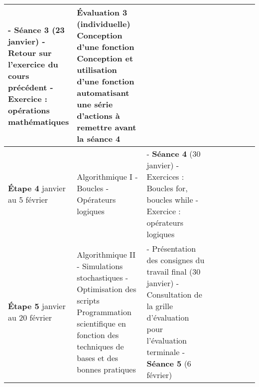 \documentclass[12]{article}
\begin{document}
\begin{center}
\begin{tabular}{| p{0.1\linewidth} | p{0.3\linewidth} | p{0.3\linewidth} | p{0.3\linewidth} | }
        - \textbf{Séance 3} (23 janvier)\hfill\hfill \linebreak 
        - Retour sur l'exercice du cours précédent\hfill\hfill \linebreak
        - Exercice : opérations mathématiques\hfill\hfill & 
        \textbf{Évaluation 3} (individuelle) \linebreak
        \textbf{Conception d'une fonction}\hfill\hfill \linebreak
    Conception et utilisation d'une fonction automatisant une série d'actions à remettre avant la séance 4\hfill\hfill \\
        \hline
        \textbf{Étape 4} \linebreak 30 janvier au 5 février & 
        Algorithmique I\hfill\hfill \linebreak\linebreak 
            - Boucles\hfill\hfill \linebreak
            - Opérateurs logiques\hfill\hfill &
        - \textbf{Séance 4} (30 janvier)\hfill\hfill \linebreak
        - Exercices : Boucles for, boucles while\hfill\hfill \linebreak
        - Exercice : opérateurs logiques\hfill\hfill & 
        \\
        \hline
        \textbf{Étape 5} \linebreak 30 janvier au 20 février & 
        Algorithmique II\hfill\hfill \linebreak\linebreak 
            - Simulations stochastiques\hfill\hfill \linebreak
            - Optimisation des scripts\hfill\hfill \linebreak\linebreak
        Programmation scientifique en fonction des techniques de bases et des bonnes pratiques &
        - Présentation des consignes du travail final (30 janvier)\hfill\hfill \linebreak
        - Consultation de la grille d'évaluation pour l'évaluation terminale\hfill\hfill \linebreak
        - \textbf{Séance 5} (6 février)\hfill\hfill \linebreak

\end{tabular}
\end{center}
\end{document}
